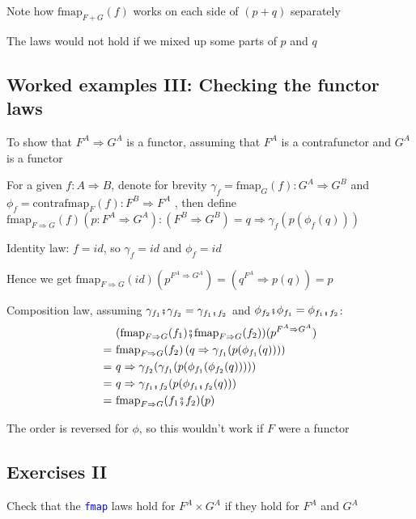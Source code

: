 Note how $\text{fmap}_{F+G}(f)$ works on each side of $\left(p+q\right)$
separately

The laws would not hold if we mixed up some parts of $p$ and $q$


\subsection{Worked examples III: Checking the functor laws}

To show that $F^{A}\Rightarrow G^{A}$ is a functor, assuming that
$F^{A}$ is a contrafunctor and $G^{A}$ is a functor

For a given $f:A\Rightarrow B$, denote for brevity $\gamma_{f}=\text{fmap}_{G}(f):G^{A}\Rightarrow G^{B}$
and $\phi_{f}=\text{contrafmap}_{F}(f):F^{B}\Rightarrow F^{A}$ ,
then define $\text{fmap}_{F\Rightarrow G}(f)(p:F^{A}\Rightarrow G^{A}):\left(F^{B}\Rightarrow G^{B}\right)=q\Rightarrow\gamma_{f}(p(\phi_{f}(q)))$

Identity law: $f=id$, so $\gamma_{f}=id$ and $\phi_{f}=id$

Hence we get $\text{fmap}_{F\Rightarrow G}(id)(p^{F^{A}\Rightarrow G^{A}})=\left(q^{F^{A}}\Rightarrow p(q)\right)=p$

Composition law, assuming $\gamma_{f_{1}}\bef\gamma_{f_{2}}=\gamma_{f_{1}\bef f_{2}}$
and $\phi_{f_{2}}\bef\phi_{f_{1}}=\phi_{f_{1}\bef f_{2}}$: 
\begin{align*}
 & (\text{fmap}_{F\Rightarrow G}(f_{1})\bef\text{fmap}_{F\Rightarrow G}(f_{2}))(p^{F^{A}\Rightarrow G^{A}})\\
=\  & \text{fmap}_{F\Rightarrow G}(f_{2})\left(q\Rightarrow\gamma_{f_{1}}(p(\phi_{f_{1}}(q)))\right)\\
=\  & q\Rightarrow\gamma_{f_{2}}(\gamma_{f_{1}}(p(\phi_{f_{1}}(\phi_{f_{2}}(q)))))\\
=\  & q\Rightarrow\gamma_{f_{1}\bef f_{2}}(p(\phi_{f_{1}\bef f_{2}}(q)))\\
=\  & \text{fmap}_{F\Rightarrow G}(f_{1}\bef f_{2})(p)
\end{align*}

The order is reversed for $\phi$, so this wouldn't work if $F$ were
a functor


\subsection{Exercises II}

Check that the \texttt{\textcolor{blue}{\footnotesize{}fmap}} laws
hold for $F^{A}\times G^{A}$ if they hold for $F^{A}$ and $G^{A}$

